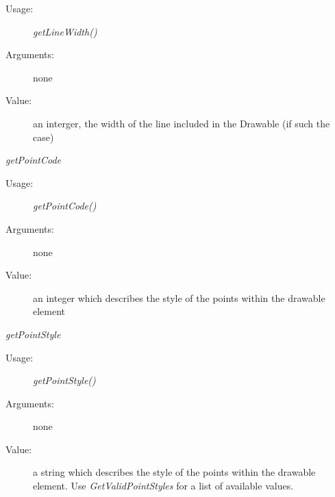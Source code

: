 \begin{description}
\begin{description}
\begin{description}
    \item[Usage:] \textit{getLineWidth()}
    \item[Arguments:] none
    \item[Value:] an interger, the width of the line included in the Drawable (if such the case)
    \end{description}
    \bigskip
  \item \textit{getPointCode}
    \begin{description}
    \item[Usage:] \textit{getPointCode()}
    \item[Arguments:] none
    \item[Value:] an integer which describes the style of the points within the drawable element
    \end{description}
    \bigskip

  \item \textit{getPointStyle}
    \begin{description}
    \item[Usage:] \textit{getPointStyle()}
    \item[Arguments:] none
    \item[Value:] a string which describes the style of the points within the drawable element. Use \textit{GetValidPointStyles} for a list of available values.
    \end{description}
    \bigskip


\end{description}
\end{description}
